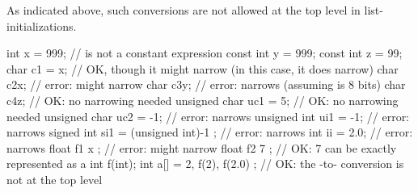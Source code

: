\begin{note} As indicated above, such conversions are not allowed at the top level in
list-initializations.\end{note} \begin{example}

\begin{codeblock}
int x = 999;              //  is not a constant expression
const int y = 999;
const int z = 99;
char c1 = x;              // OK, though it might narrow (in this case, it does narrow)
char c2{x};               // error: might narrow
char c3{y};               // error: narrows (assuming  is 8 bits)
char c4{z};               // OK: no narrowing needed
unsigned char uc1 = {5};  // OK: no narrowing needed
unsigned char uc2 = {-1}; // error: narrows
unsigned int ui1 = {-1};  // error: narrows
signed int si1 =
  { (unsigned int)-1 };   // error: narrows
int ii = {2.0};           // error: narrows
float f1 { x };           // error: might narrow
float f2 { 7 };           // OK: 7 can be exactly represented as a 
int f(int);
int a[] =
  { 2, f(2), f(2.0) };    // OK: the -to- conversion is not at the top level
\end{codeblock}
\end{example}%
%
%
